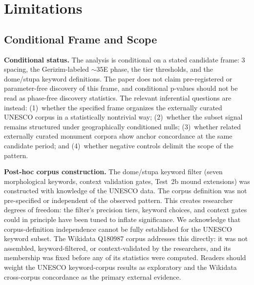 \section{Limitations}
\label{sec:limitations}

\subsection{Conditional Frame and Scope}
\label{sec:limitations_circularity}
\label{sec:circularity}

\textbf{Conditional status.}
The analysis is conditional on a stated candidate frame: 3\textdegree{}
spacing, the Gerizim-labeled $\sim$35\textdegree{}E phase, the tier
thresholds, and the dome/stupa keyword definitions. The paper does not
claim pre-registered or parameter-free discovery of this frame, and
conditional p-values should not be read as phase-free discovery
statistics. The relevant inferential questions are instead:
(1)~whether the specified frame organizes the
externally curated UNESCO corpus in a statistically nontrivial way;
(2)~whether the subset signal remains structured under
geographically conditioned nulls; (3)~whether related externally
curated monument corpora show anchor concordance at the same
candidate period; and (4)~whether negative controls delimit the scope
of the pattern.

\textbf{Post-hoc corpus construction.}
The dome/stupa keyword filter (seven morphological keywords, context
validation gates, Test~2b mound extensions) was constructed with
knowledge of the UNESCO data. The corpus definition was not
pre-specified or independent of the observed pattern. This creates
researcher degrees of freedom: the filter's precision tiers, keyword
choices, and context gates could in principle have been tuned to
inflate significance. We acknowledge that corpus-definition
independence cannot be fully established for the UNESCO keyword subset.
The Wikidata Q180987 corpus addresses this directly: it was not
assembled, keyword-filtered, or context-validated by the researchers,
and its membership was fixed before any of its statistics were
computed. Readers should weight the UNESCO keyword-corpus results as
exploratory and the Wikidata cross-corpus concordance as the primary
external evidence.

